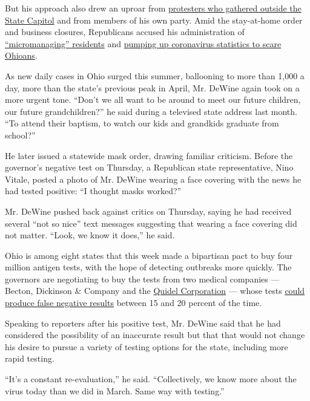 But his approach also drew an uproar from
\href{https://www.dispatch.com/news/20200416/yoursquove-seen-photo-of-ohio-protesters-herersquos-story-behind-it}{protesters
who gathered outside the State Capitol} and from members of his own
party. Amid the stay-at-home order and business closures, Republicans
accused his administration of
\href{https://twitter.com/Rob_McColley/status/1256325645920907264?s=20}{``micromanaging''
residents} and
\href{https://www.daytondailynews.com/news/local/some-push-open-economy-dewine-says-plan-the-works-but-threat-not-over/uTxhHQuX3r4LJzjBVACyDK/}{pumping
up coronavirus statistics to scare Ohioans}.

As new daily cases in Ohio surged this summer, ballooning to more than
1,000 a day, more than the state's previous peak in April, Mr. DeWine
again took on a more urgent tone. ``Don't we all want to be around to
meet our future children, our future grandchildren?'' he said during a
televised state address last month. ``To attend their baptism, to watch
our kids and grandkids graduate from school?''

He later issued a statewide mask order, drawing familiar criticism.
Before the governor's negative test on Thursday, a Republican state
representative, Nino Vitale, posted a photo of Mr. DeWine wearing a face
covering with the news he had tested positive: ``I thought masks
worked?''

Mr. DeWine pushed back against critics on Thursday, saying he had
received several ``not so nice'' text messages suggesting that wearing a
face covering did not matter. ``Look, we know it does,'' he said.

Ohio is among eight states that this week made a bipartisan pact to buy
four million antigen tests, with the hope of detecting outbreaks more
quickly. The governors are negotiating to buy the tests from two medical
companies --- Becton, Dickinson \& Company and the
\href{https://www.nytimes3xbfgragh.onion/2020/05/09/health/antigen-testing-fda-coronavirus.html}{Quidel
Corporation} --- whose tests
\href{https://www.nytimes3xbfgragh.onion/2020/07/06/health/fast-coronavirus-tests.html}{could
produce false negative results} between 15 and 20 percent of the time.

Speaking to reporters after his positive test, Mr. DeWine said that he
had considered the possibility of an inaccurate result but that that
would not change his desire to pursue a variety of testing options for
the state, including more rapid testing.

``It's a constant re-evaluation,'' he said. ``Collectively, we know more
about the virus today than we did in March. Same way with testing.''

